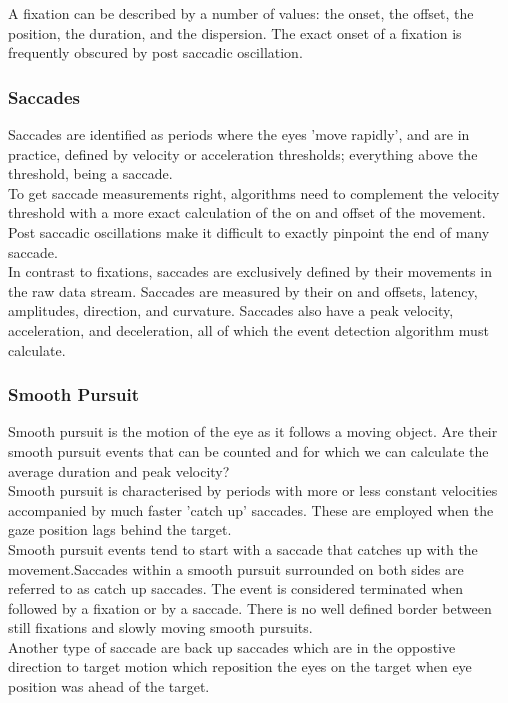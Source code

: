 \documentclass[12pt]{article}
\theoremstyle{definition}
\begin{document}
A fixation can be described by a number of values: the onset, the offset, the position, the duration, and the dispersion. The exact onset of a fixation is frequently obscured by post saccadic oscillation. 

\subsubsection{Saccades}
Saccades are identified as periods where the eyes 'move rapidly', and are in practice, defined by velocity or acceleration thresholds; everything above the threshold, being a saccade.\\

To get saccade measurements right, algorithms need to complement the velocity threshold with a more exact calculation of the on and offset of the movement. Post saccadic oscillations make it difficult to exactly pinpoint the end of many saccade.\\

In contrast to fixations, saccades are exclusively defined by their movements in the raw data stream. Saccades are measured by their on and offsets, latency, amplitudes, direction, and curvature. Saccades also have a peak velocity, acceleration, and deceleration, all of which the event detection algorithm must calculate. 

\subsubsection{Smooth Pursuit}
Smooth pursuit is the motion of the eye as it follows a moving object. Are their smooth pursuit events that can be counted and for which we can calculate the average duration and peak velocity?\\

Smooth pursuit is characterised by periods with more or less constant velocities accompanied by much faster 'catch up' saccades. These are employed when the gaze position lags behind the target.\\

Smooth pursuit events tend to start with a saccade that catches up with the movement.Saccades within a smooth pursuit surrounded on both sides are referred to as catch up saccades. The event is considered terminated when followed by a fixation or by a saccade. There is no well defined border between still fixations and slowly moving smooth pursuits.\\

Another type of saccade are back up saccades which are in the oppostive direction to target motion which reposition the eyes on the target when eye position was ahead of the target. 
\end{document}
